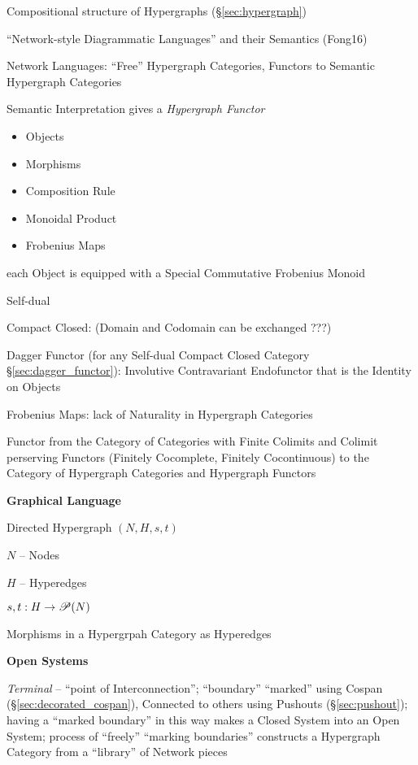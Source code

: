Compositional structure of Hypergraphs (\S\ref{sec:hypergraph})

``Network-style Diagrammatic Languages'' and their Semantics (Fong16)

Network Languages: ``Free'' Hypergraph Categories,
Functors to Semantic Hypergraph Categories

Semantic Interpretation gives a \emph{Hypergraph Functor}

\begin{itemize}
  \item Objects
  \item Morphisms
  \item Composition Rule
  \item Monoidal Product
  \item Frobenius Maps
\end{itemize}

each Object is equipped with a Special Commutative Frobenius
Monoid

Self-dual

Compact Closed: (Domain and Codomain can be exchanged ???) %

Dagger Functor (for any Self-dual Compact Closed Category
\S\ref{sec:dagger_functor}): Involutive Contravariant Endofunctor that
is the Identity on Objects

Frobenius Maps: lack of Naturality in Hypergraph Categories

Functor from the Category of Categories with Finite Colimits and
Colimit perserving Functors (Finitely Cocomplete, Finitely
Cocontinuous) to the Category of Hypergraph Categories and Hypergraph
Functors


\textbf{Graphical Language}

Directed Hypergraph $(N,H,s,t)$

$N$ -- Nodes

$H$ -- Hyperedges

$s,t : H \rightarrow \mathscr{P}(N)$

Morphisms in a Hypergrpah Category as Hyperedges


\textbf{Open Systems}

\emph{Terminal} -- ``point of Interconnection''; ``boundary''
``marked'' using Cospan (\S\ref{sec:decorated_cospan}), Connected to
others using Pushouts (\S\ref{sec:pushout}); having a ``marked
boundary'' in this way makes a Closed System into an Open System;
process of ``freely'' ``marking boundaries'' constructs a Hypergraph
Category from a ``library'' of Network pieces


